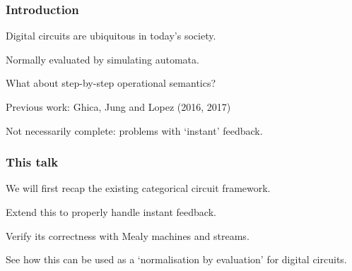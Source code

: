\begin{frame}
    \frametitle{Introduction}

    Digital circuits are ubiquitous in today's society.

    \pause

    Normally evaluated by simulating \alert{automata}.

    \pause

    What about step-by-step \alert{operational semantics}?

    \pause

    \alert{Previous work:} Ghica, Jung and Lopez (2016, 2017)

    \pause

    Not necessarily \alert{complete}: problems with `instant' feedback.

\end{frame}

\begin{frame}
    \frametitle{This talk}

    We will first recap the existing \alert{categorical circuit framework}.

    \pause

    Extend this to properly handle \alert{instant feedback}.

    \pause

    Verify its correctness with \alert{Mealy machines} and \alert{streams}.

    \pause

    See how this can be used as a `normalisation by evaluation' for digital circuits.

\end{frame}